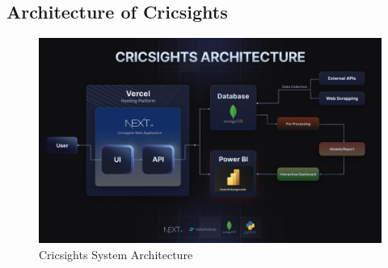 \subsection{Architecture of Cricsights}
\begin{figure}[H]
    \centering
    \includegraphics[width=\textwidth]{cricsight_architecuture.jpg}
    \caption{Cricsights System Architecture}
    \label{fig:architecture}
\end{figure}


